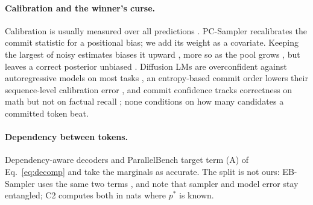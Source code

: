 \paragraph{Calibration and the winner's curse.}
Calibration is usually measured over all predictions \citep{guo2017calibration}. PC-Sampler
\citep{huang2025pcsampler} recalibrates the commit statistic for a positional bias; we add its
weight as a covariate. Keeping the largest of noisy estimates biases it upward
\citep{andrews2024winners}, more so as the pool grows \citep{dalal2026beam}, but leaves a correct
posterior unbiased \citep{dawid1994selection,efron2011tweedie}. Diffusion LMs are overconfident
against autoregressive models on most tasks \citep{yadav2026bidirectional}, an entropy-based
commit order lowers their sequence-level calibration error \citep{jiang2026bayeser}, and commit
confidence tracks correctness on math but not on factual recall
\citep{asaria2026diffusiongemma}; none conditions on how many candidates a committed token beat.

\paragraph{Dependency between tokens.}
Dependency-aware decoders \citep{kim2026dapd,ringel2026demask,azangulov2026punt} and
ParallelBench \citep{kang2026parallelbench} target term (A) of Eq.~\ref{eq:decomp} and take
the marginals as accurate. The split is not ours: EB-Sampler uses the same two terms
\citep{benhamu2025entropy}, and \citet{tang2026sampler} note that sampler and model error stay
entangled; C2 computes both in nats where $p^*$ is known.
